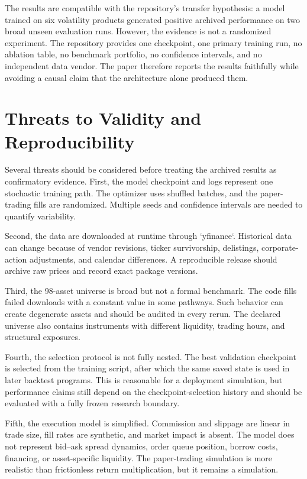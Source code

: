 \documentclass[10pt,a4paper,twocolumn]{article}
\begin{document}
The results are compatible with the repository's transfer hypothesis: a model trained on six volatility products generated positive archived performance on two broad unseen evaluation runs. However, the evidence is not a randomized experiment. The repository provides one checkpoint, one primary training run, no ablation table, no benchmark portfolio, no confidence intervals, and no independent data vendor. The paper therefore reports the results faithfully while avoiding a causal claim that the architecture alone produced them.

\section{Threats to Validity and Reproducibility}
Several threats should be considered before treating the archived results as confirmatory evidence. First, the model checkpoint and logs represent one stochastic training path. The optimizer uses shuffled batches, and the paper-trading fills are randomized. Multiple seeds and confidence intervals are needed to quantify variability.

Second, the data are downloaded at runtime through `yfinance`. Historical data can change because of vendor revisions, ticker survivorship, delistings, corporate-action adjustments, and calendar differences. A reproducible release should archive raw prices and record exact package versions.

Third, the 98-asset universe is broad but not a formal benchmark. The code fills failed downloads with a constant value in some pathways. Such behavior can create degenerate assets and should be audited in every rerun. The declared universe also contains instruments with different liquidity, trading hours, and structural exposures.

Fourth, the selection protocol is not fully nested. The best validation checkpoint is selected from the training script, after which the same saved state is used in later backtest programs. This is reasonable for a deployment simulation, but performance claims still depend on the checkpoint-selection history and should be evaluated with a fully frozen research boundary.

Fifth, the execution model is simplified. Commission and slippage are linear in trade size, fill rates are synthetic, and market impact is absent. The model does not represent bid--ask spread dynamics, order queue position, borrow costs, financing, or asset-specific liquidity. The paper-trading simulation is more realistic than frictionless return multiplication, but it remains a simulation.
\end{document}
